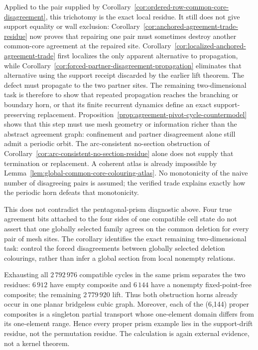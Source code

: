Applied to the pair supplied by
Corollary~\ref{cor:ordered-row-common-core-disagreement}, this trichotomy is
the exact local residue.  It still does not give support equality or wall
exclusion: Corollary~\ref{cor:anchored-agreement-trade-residue} now proves
that repairing one pair must sometimes destroy another common-core agreement
at the repaired site.  Corollary~\ref{cor:localized-anchored-agreement-trade}
first localizes the only apparent alternative to propagation, while
Corollary~\ref{cor:forced-partner-disagreement-propagation} eliminates that
alternative using the support receipt discarded by the earlier lift theorem.
The defect must propagate to the two partner sites.  The remaining
two-dimensional task is therefore to show that repeated propagation reaches
the branching or boundary horn, or that its finite recurrent dynamics define
an exact support-preserving replacement.  Proposition~\ref{prop:agreement-pivot-cycle-countermodel}
shows that this step must use mesh geometry or information richer than the
abstract agreement graph: confinement and partner disagreement alone still
admit a periodic orbit.  The
arc-consistent no-section obstruction of
Corollary~\ref{cor:arc-consistent-no-section-residue} alone does not supply
that termination or replacement.  A coherent atlas is already impossible by
Lemma~\ref{lem:global-common-core-colouring-atlas}.  No monotonicity of the
naive number of disagreeing pairs is assumed; the verified trade explains
exactly how the periodic horn defeats that monotonicity.

This does not contradict the pentagonal-prism diagnostic above.  Four true
agreement bits attached to the four sides of one compatible cell state do
not assert that one globally selected family agrees on the common deletion
for every pair of mesh sites.  The corollary identifies the exact remaining
two-dimensional task: control the forced disagreements between globally
selected deletion colourings, rather than infer a global section from local
nonempty relations.

Exhausting all $2\,792\,976$ compatible cycles in the same prism separates
the two residues: $6\,912$ have empty composite and $6\,144$ have a
nonempty fixed-point-free composite; the remaining $2\,779\,920$ lift.
Thus both obstruction horns already occur in one planar bridgeless cubic
graph.  Moreover, each of the (6,144) proper composites is a singleton
partial transport whose one-element domain differs from its one-element
range.  Hence every proper prism example lies in the support-drift residue,
not the permutation residue.  The calculation is again external evidence,
not a kernel theorem.

